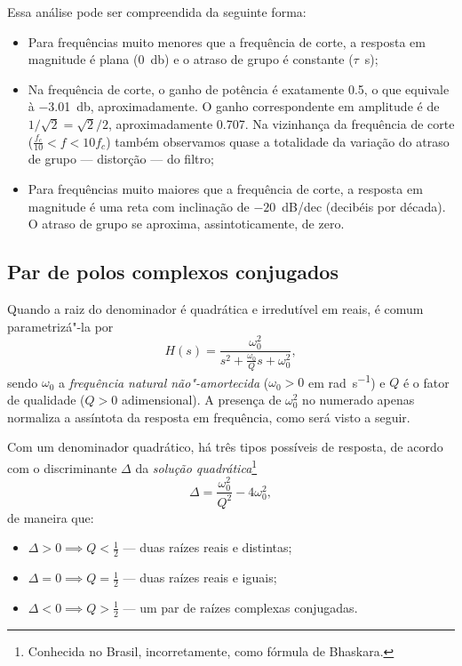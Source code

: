 Essa análise pode ser compreendida da seguinte forma:
\begin{itemize}
	\item Para frequências muito menores que a frequência de corte, a resposta em magnitude é plana (\qty{0}{\decibel}) e o atraso de grupo é constante ($\tau$~\unit{\second});
	\item Na frequência de corte, o ganho de potência é exatamente \num{0.5}, o que equivale à \qty{-3.01}{\decibel}, aproximadamente. O ganho correspondente em amplitude é de $1\slash\sqrt{2}=\sqrt{2}\slash2$, aproximadamente \num{0.707}. Na vizinhança da frequência de corte ($\frac{f_c}{10}<f<10f_c$) também observamos quase a totalidade da variação do atraso de grupo --- distorção --- do filtro;
	\item Para frequências muito maiores que a frequência de corte, a resposta em magnitude é uma reta com inclinação de $-20$~\unit{dB}\slash dec (decibéis por década). O atraso de grupo se aproxima, assintoticamente, de zero.
\end{itemize}

\subsection{Par de polos complexos conjugados}

Quando a raiz do denominador é quadrática e irredutível em reais, é comum parametrizá"-la por
\begin{equation}
	H(s)=\frac{\omega_0^2}{\displaystyle s^2+\frac{\omega_0}{Q}s+\omega_0^2},
\end{equation}
sendo $\omega_0$ a \emph{frequência natural não"-amortecida} ($\omega_0>0$ em \unit{\radian\per\second}) e $Q$ é o fator de qualidade ($Q>0$ adimensional). A presença de $\omega_0^2$ no numerado apenas normaliza a assíntota da resposta em frequência, como será visto a seguir.

Com um denominador quadrático, há três tipos possíveis de resposta, de acordo com o discriminante $\Delta$ da \emph{solução quadrática}\footnote{Conhecida no Brasil, incorretamente, como fórmula de Bhaskara.}
\begin{equation}
	\Delta=\frac{\omega_0^2}{Q^2}-4\omega_0^2,
\end{equation}
de maneira que:
\begin{itemize}
	\item $\Delta>0\implies Q<\frac{1}{2}$ --- duas raízes reais e distintas;
	\item $\Delta=0\implies Q=\frac{1}{2}$ --- duas raízes reais e iguais;
	\item $\Delta<0\implies Q>\frac{1}{2}$ --- um par de raízes complexas conjugadas.
\end{itemize}

